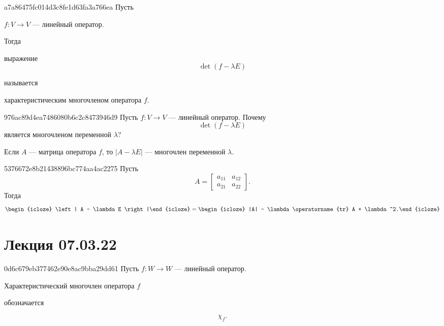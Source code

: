 \begin{note}{a7a86475fc014d3c8fe1d63fa3a766ea}
    Пусть \begin{icloze}{3}\( f : V \to V \) --- линейный оператор.\end{icloze} Тогда \begin{icloze}{2}выражение
    \[
        \det (f - \lambda E)
    \]
    \end{icloze} называется \begin{icloze}{1}характеристическим многочленом оператора \( f \).\end{icloze}
\end{note}

\begin{note}{976ac89d4ea7486080b6c2c8473946d9}
    Пусть \( f : V \to V \) --- линейный оператор. Почему
    \[
        \det (f - \lambda E)
    \]
    является многочленом переменной \( \lambda \)?

    \begin{cloze}{1}
        Если \( A \) --- матрица оператора \( f \), то \( \left| A - \lambda E \right|  \) --- многочлен переменной \( \lambda \).
    \end{cloze}
\end{note}

\begin{note}{5376672e8b21438896bc774aa4ac2275}
    Пусть
    \[
        A = \begin{bmatrix}
            a_{11} & a_{12} \\
            a_{21} & a_{22}
        \end{bmatrix}.
    \]
    Тогда
    \[
        \begin{icloze}{2}\left| A - \lambda E \right|\end{icloze}
        = \begin{icloze}{1}|A| - \lambda \operatorname{tr} A + \lambda^2.\end{icloze}
\]
\end{note}

\section{Лекция 07.03.22}
\begin{note}{0d6c679eb377462e90e8ac9bba29dd61}
    Пусть \( f : W \to W \) --- линейный оператор.
    \begin{icloze}{2}Характеристический многочлен оператора \( f \)\end{icloze} обозначается \begin{icloze}{1}
    \[
        \chi_f.
    \]
\end{icloze}
\end{note}

